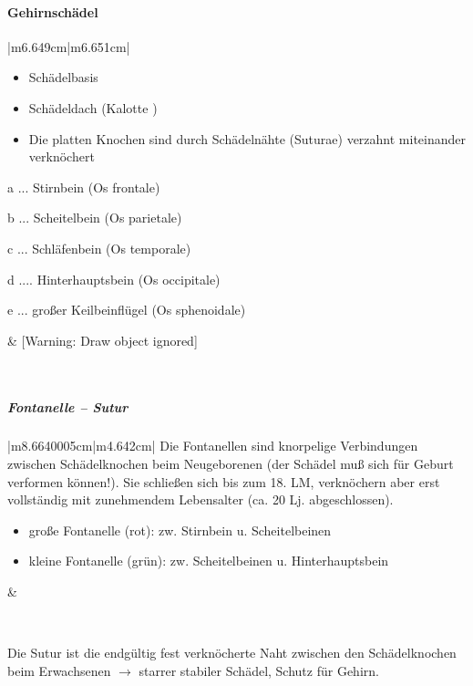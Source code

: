 \documentclass{article}
\begin{document}
\paragraph{Gehirnsch\"adel}
\begin{center}
\tablehead{}\begin{supertabular}{|m{6.649cm}|m{6.651cm}|}
\hline
\begin{itemize}
\item Sch\"adelbasis

\item Sch\"adeldach (Kalotte )

\item Die platten Knochen sind durch Sch\"adeln\"ahte  (Suturae)
verzahnt miteinander verkn\"ochert

\end{itemize}
a ... Stirnbein (Os frontale)

b ... Scheitelbein (Os parietale)

c ... Schl\"afenbein (Os temporale)

d .... Hinterhauptsbein (Os occipitale)

e ... gro{\ss}er Keilbeinfl\"ugel (Os sphenoidale)

 &
[Warning: Draw object ignored]

\\\hline
\end{supertabular}
\end{center}
\subparagraph[Fontanelle -- Sutur]{Fontanelle -- Sutur}
\begin{center}
\tablehead{}\begin{supertabular}{|m{8.6640005cm}|m{4.642cm}|}
\hline
Die Fontanellen sind knorpelige  Verbindungen  zwischen 
Sch\"adelknochen beim Neu\-geborenen (der Sch\"adel mu{\ss} sich f\"ur 
Geburt verformen k\"onnen!). Sie schlie{\ss}en  sich bis zum 18. LM,
verkn\"ochern  aber erst vollst\"andig mit zunehmendem  Lebensalter
(ca. 20 Lj. abgeschlossen). 

\begin{itemize}
\item gro{\ss}e Fontanelle (rot): zw. Stirnbein u. Scheitelbeinen

\item kleine Fontanelle (gr\"un): zw. Scheitelbeinen u.
Hinter\-haupts\-bein

\end{itemize}
 &
\par

\\\hline
\end{supertabular}
\end{center}
Die Sutur ist die endg\"ultig fest verkn\"ocherte Naht zwischen den
Sch\"adelknochen beim Erwachsenen ${\rightarrow}$ starrer  stabiler 
Sch\"adel, Schutz  f\"ur Gehirn.
\end{document}
